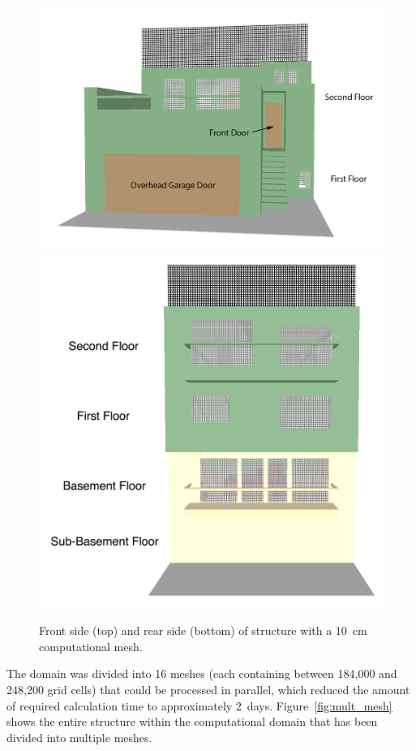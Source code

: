 \documentclass[12pt,oneside]{book}
\begin{document}
\begin{figure}[!ht]
\includegraphics[width=5.0in]{../Figures/SMV_Exterior_Grid_Front} \\
\includegraphics[width=4.5in]{../Figures/SMV_Exterior_Grid_Rear}
\caption[Front and rear sides of the structure with a 10~cm computational mesh.]
{Front side (top) and rear side (bottom) of structure with a 10~cm computational mesh.}
\label{fig:SMV_exterior_grid}
\end{figure}


\clearpage


The domain was divided into 16 meshes (each containing between 184,000 and 248,200 grid cells) that could be processed in parallel, which reduced the amount of required calculation time to approximately 2~days. Figure~\ref{fig:mult_mesh} shows the entire structure within the computational domain that has been divided into multiple meshes.
\end{document}
